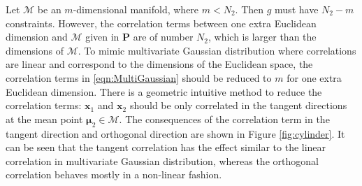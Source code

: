 \documentclass[12pt]{article}
\begin{document}
Let $\mathcal{M}$ be an $m$-dimensional manifold, where $m<N_2$.
Then $g$ must have $N_2-m$ constraints.
However, the correlation terms between one extra Euclidean dimension and $\mathcal{M}$ given in $\mathbf{P}$ are of number $N_2$, which is larger than the dimensions of $\mathcal{M}$.
To mimic multivariate Gaussian distribution where correlations are linear and correspond to the dimensions of the Euclidean space, the correlation terms in \eqref{eqn:MultiGaussian} should be reduced to $m$ for one extra Euclidean dimension.
There is a geometric intuitive method to reduce the correlation terms: $\bm{x}_1$ and $\bm{x}_2$ should be only correlated in the tangent directions at the mean point $\bm{\mu}_2\in\mathcal{M}$.
The consequences of the correlation term in the tangent direction and orthogonal direction are shown in Figure \ref{fig:cylinder}.
It can be seen that the tangent correlation has the effect similar to the linear correlation in multivariate Gaussian distribution, whereas the orthogonal correlation behaves mostly in a non-linear fashion.
\end{document}
